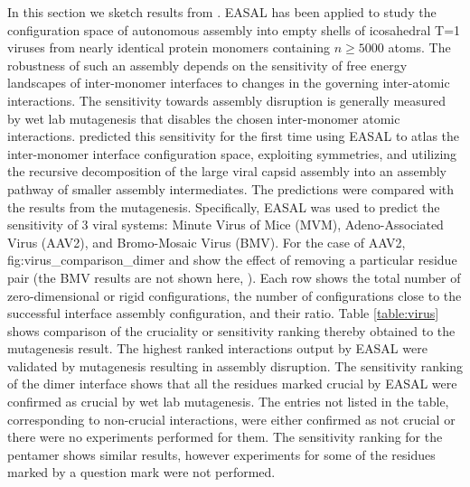 In this section we sketch results from \cite{Wu2014Virus}. EASAL has been
applied to study the configuration space of autonomous assembly into empty
shells of icosahedral T=1 viruses from nearly identical protein monomers
containing $n \ge 5000$ atoms. The robustness of such an assembly depends on
the sensitivity of free energy landscapes of inter-monomer interfaces to
changes in the governing inter-atomic interactions. The sensitivity towards
assembly disruption is generally measured by wet lab mutagenesis that disables
the chosen inter-monomer atomic interactions. \cite{Wu2014Virus} predicted this
sensitivity for the first time using EASAL to atlas the inter-monomer interface
configuration space, exploiting symmetries, and utilizing the recursive
decomposition of the large viral capsid assembly into an assembly pathway of
smaller assembly intermediates. The predictions were compared with the results
from the mutagenesis. Specifically, EASAL was used to predict the sensitivity
of 3 viral systems: Minute Virus of Mice (MVM), Adeno-Associated Virus (AAV2),
and Bromo-Mosaic Virus (BMV). For the case of AAV2, \figref
{fig:virus_comparison_dimer} and  show
the effect of removing a particular residue pair (the BMV results are not shown
here, \cite{unpublished}). Each row shows the total number of zero-dimensional
or rigid configurations, the number of configurations close to the successful
interface assembly configuration, and their ratio. Table \ref{table:virus}
shows comparison of the cruciality or sensitivity ranking thereby obtained to
the mutagenesis result. The highest ranked interactions output by EASAL were
validated by mutagenesis resulting in assembly disruption. The sensitivity
ranking of the dimer interface shows that all the residues marked crucial by
EASAL were confirmed as crucial by wet lab mutagenesis. The entries not listed
in the table, corresponding to non-crucial interactions, were either confirmed
as not crucial or there were no experiments performed for them. The sensitivity
ranking for the pentamer shows similar results, however experiments for some of
the residues marked by a question mark were not performed.

